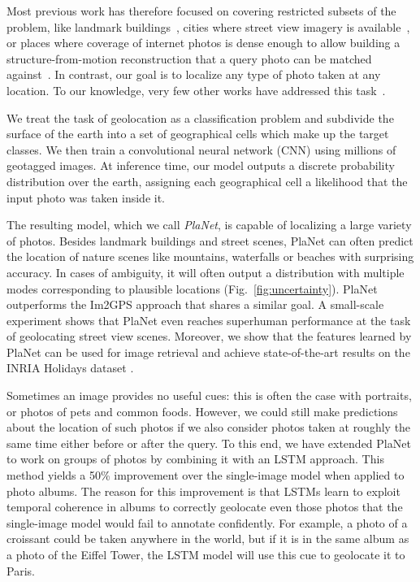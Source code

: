 \documentclass[10pt,twocolumn,letterpaper]{article}
\begin{document}
Most previous work has therefore focused on
covering restricted subsets of the problem, like landmark
buildings~\cite{Avrithis10MM,Quack08CIVR,Zheng09CVPR}, cities where
street view imagery is
available~\cite{Chen11CVPR,Kim15ICCV,Zamir14PAMI}, or places where
coverage of internet photos is dense enough to allow building a
structure-from-motion reconstruction that a query photo can be matched
against~\cite{Li12ECCV,Sattler12ECCV}.  In contrast, our goal is to
localize any type of photo taken at any location. To our knowledge,
very few other works have addressed this
task~\cite{Hays08CVPR,Hays14MLEVI}.

We treat the task of geolocation as a classification
problem and subdivide the surface of the earth into a set of
geographical cells which make up the target classes. We then train a convolutional neural network
(CNN) \cite{Szegedy15CVPR} using millions of geotagged images. At inference time, our model
outputs a discrete probability distribution over the earth,
assigning each geographical cell a likelihood that the input
photo was taken inside it.

The resulting model, which we call \emph{PlaNet}, is capable of
localizing a large variety of photos. Besides landmark buildings and
street scenes, PlaNet can often predict the location of nature
scenes like mountains, waterfalls or beaches with surprising accuracy.
In cases of ambiguity, it will often output a distribution
with multiple modes corresponding to plausible locations
(Fig.~\ref{fig:uncertainty}). PlaNet outperforms the Im2GPS
approach \cite{Hays08CVPR,Hays14MLEVI} that shares a similar goal. A
small-scale experiment shows that PlaNet even reaches superhuman
performance at the task of geolocating street view scenes.
Moreover, we show that the features learned by PlaNet can be used for image retrieval and achieve state-of-the-art results on the INRIA Holidays dataset \cite{Jegou08ECCV}.

Sometimes an image provides no useful cues: this is often the case
with portraits, or photos of pets and common foods.  However, we could
still make predictions about the location of such photos if we also
consider photos taken at roughly the same time either before or after
the query. To this end, we have extended PlaNet to work on groups
of photos by combining it with an LSTM approach.
This method yields a 50\% improvement over the single-image model when
applied to photo albums. The reason for this improvement is that LSTMs
learn to exploit temporal coherence in albums to correctly
geolocate even those photos that the single-image model would fail
to annotate confidently. For example, a photo of a croissant could be
taken anywhere in the world, but if it is in the same album as a photo
of the Eiffel Tower, the LSTM model will use this cue to
geolocate it to Paris.
\end{document}
